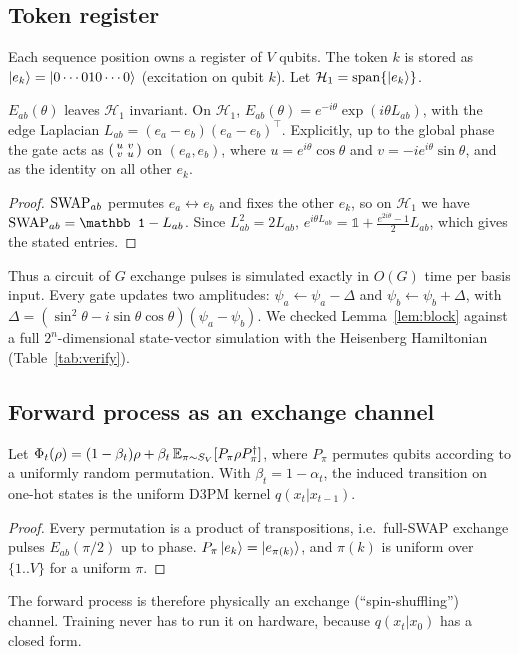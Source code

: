\subsection{Token register}
Each sequence position owns a register of $V$ qubits. The token $k$ is stored as
$\ket{e_k}=\ket{0\cdots010\cdots0}$ (excitation on qubit $k$). Let $\mathcal H_1=\mathrm{span}\{\ket{e_k}\}$.

\begin{lemma}\label{lem:block}
$E_{ab}(\theta)$ leaves $\mathcal H_1$ invariant. On $\mathcal H_1$,
$E_{ab}(\theta)=e^{-i\theta}\exp(i\theta L_{ab})$, with the edge Laplacian
$L_{ab}=(e_a-e_b)(e_a-e_b)^{\!\top}$. Explicitly, up to the global phase the gate acts as
$\begin{psmallmatrix}u&v\\v&u\end{psmallmatrix}$ on $(e_a,e_b)$, where $u=e^{i\theta}\cos\theta$ and
$v=-ie^{i\theta}\sin\theta$, and as the identity on all other $e_k$.
\end{lemma}
\begin{proof}
$\mathrm{SWAP}_{ab}$ permutes $e_a\leftrightarrow e_b$ and fixes the other $e_k$, so on $\mathcal H_1$ we have
$\SWAP_{ab}=\mathbb 1-L_{ab}$. Since $L_{ab}^2=2L_{ab}$,
$e^{i\theta L_{ab}}=\mathbb 1+\tfrac{e^{2i\theta}-1}{2}L_{ab}$, which gives the stated entries.
\end{proof}
Thus a circuit of $G$ exchange pulses is simulated exactly in $O(G)$ time per basis input. Every gate
updates two amplitudes: $\psi_a\!\leftarrow\!\psi_a-\Delta$ and $\psi_b\!\leftarrow\!\psi_b+\Delta$, with
$\Delta=(\sin^2\theta-i\sin\theta\cos\theta)(\psi_a-\psi_b)$. We checked Lemma~\ref{lem:block} against a
full $2^n$-dimensional state-vector simulation with the Heisenberg Hamiltonian
(Table~\ref{tab:verify}).

\subsection{Forward process as an exchange channel}
\begin{proposition}\label{prop:forward}
Let $\Phi_t(\rho)=(1-\beta_t)\rho+\beta_t\,\mathbb{E}_{\pi\sim S_V}[P_\pi\rho P_\pi^\dagger]$, where $P_\pi$
permutes qubits according to a uniformly random permutation. With $\beta_t=1-\alpha_t$, the induced
transition on one-hot states is the uniform D3PM kernel $q(x_t|x_{t-1})$.
\end{proposition}
\begin{proof}
Every permutation is a product of transpositions, i.e.\ full-SWAP exchange pulses $E_{ab}(\pi/2)$ up to
phase. $P_\pi\ket{e_k}=\ket{e_{\pi(k)}}$, and $\pi(k)$ is uniform over $\{1..V\}$ for a uniform $\pi$.
\end{proof}
The forward process is therefore physically an exchange (``spin-shuffling'') channel. Training never
has to run it on hardware, because $q(x_t|x_0)$ has a closed form.

